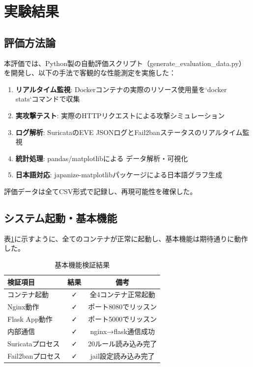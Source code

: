 \documentclass[12pt,a4paper]{article}
\begin{document}
\section{実験結果}

\subsection{評価方法論}

本評価では、Python製の自動評価スクリプト（generate\_evaluation\_data.py）を開発し、以下の手法で客観的な性能測定を実施した：

\begin{enumerate}
    \item \textbf{リアルタイム監視}: Dockerコンテナの実際のリソース使用量を`docker stats`コマンドで収集
    \item \textbf{実攻撃テスト}: 実際のHTTPリクエストによる攻撃シミュレーション
    \item \textbf{ログ解析}: SuricataのEVE JSONログとFail2banステータスのリアルタイム監視
    \item \textbf{統計処理}: pandas/matplotlibによる データ解析・可視化
    \item \textbf{日本語対応}: japanize-matplotlibパッケージによる日本語グラフ生成
\end{enumerate}

評価データは全てCSV形式で記録し、再現可能性を確保した。

\subsection{システム起動・基本機能}

表\ref{tab:basic_results}に示すように、全てのコンテナが正常に起動し、基本機能は期待通りに動作した。

\begin{table}[H]
\centering
\caption{基本機能検証結果}
\label{tab:basic_results}
\begin{tabular}{@{}lcc@{}}
\toprule
検証項目 & 結果 & 備考 \\
\midrule
コンテナ起動 & ✓ & 全4コンテナ正常起動 \\
Nginx動作 & ✓ & ポート8080でリッスン \\
Flask App動作 & ✓ & ポート5000でリッスン \\
内部通信 & ✓ & nginx→flask通信成功 \\
Suricataプロセス & ✓ & 20ルール読み込み完了 \\
Fail2banプロセス & ✓ & jail設定読み込み完了 \\
\bottomrule
\end{tabular}
\end{table}
\end{document}
